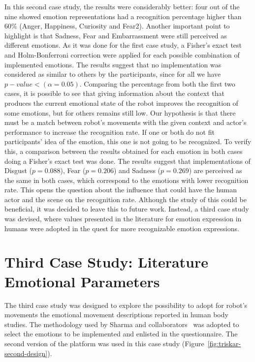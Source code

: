 In this second case study, the results were considerably better: four out of the nine showed emotion representations had a recognition percentage higher than 60\% (Anger, Happiness, Curiosity and Fear2). Another important point to highlight is that Sadness, Fear and Embarrassment were still perceived as different emotions. As it was done for the first case study, a Fisher's exact test and Holm-Bonferroni correction were applied for each possible combination of implemented emotions. The results suggest that no implementation was considered as similar to others by the participants, since for all we have $p-value<(\alpha = 0.05)$. 
Comparing the percentage from both the first two cases, it is possible to see that giving information about the context that produces the current emotional state of the robot improves the recognition of some emotions, but for others remains still low. Our hypothesis is that there must be a match between robot's movements with the given context and actor's performance to increase the recognition rate. If one or both do not fit participants' idea of the emotion, this one is not going to be recognized. To verify this, a comparison between the results obtained for each emotion in both cases doing a Fisher's exact test was done. The results suggest that implementations of Disgust ($p=0.088$), Fear ($p=0.206$) and Sadness ($p=0.269$) are perceived as the same in both cases, which correspond to the emotions with lower recognition rate. This opens the question about the influence that could have the human actor and the scene on the recognition rate. Although the study of this could be beneficial, it was decided to leave this to future work. Instead, a third case study was devised, where values presented in the literature for emotion expression in humans were adopted in the quest for more recognizable emotion expressions.

\section{Third Case Study: Literature Emotional Parameters}

The third case study was designed to explore the possibility to adopt for robot's movements the emotional movement descriptions reported in human body studies. The methodology used by Sharma and collaborators~\cite{Sharma2013} was adopted to select the emotions to be implemented and enlisted in the questionnaire. The second version of the platform was used in this case study (Figure~\ref{fig:triskar-second-design}).

